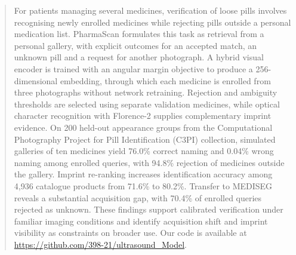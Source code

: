 \begin{abstract}
For patients managing several medicines, verification of loose pills involves recognising newly enrolled medicines while rejecting pills outside a personal medication list. PharmaScan formulates this task as retrieval from a personal gallery, with explicit outcomes for an accepted match, an unknown pill and a request for another photograph. A hybrid visual encoder is trained with an angular margin objective to produce a 256-dimensional embedding, through which each medicine is enrolled from three photographs without network retraining. Rejection and ambiguity thresholds are selected using separate validation medicines, while optical character recognition with Florence-2 supplies complementary imprint evidence. On 200 held-out appearance groups from the Computational Photography Project for Pill Identification (C3PI) collection, simulated galleries of ten medicines yield 76.0\% correct naming and 0.04\% wrong naming among enrolled queries, with 94.8\% rejection of medicines outside the gallery. Imprint re-ranking increases identification accuracy among 4,936 catalogue products from 71.6\% to 80.2\%. Transfer to MEDISEG reveals a substantial acquisition gap, with 70.4\% of enrolled queries rejected as unknown. These findings support calibrated verification under familiar imaging conditions and identify acquisition shift and imprint visibility as constraints on broader use.
Our code is available at \url{https://github.com/398-21/ultrasound_Model}.
\end{abstract}
